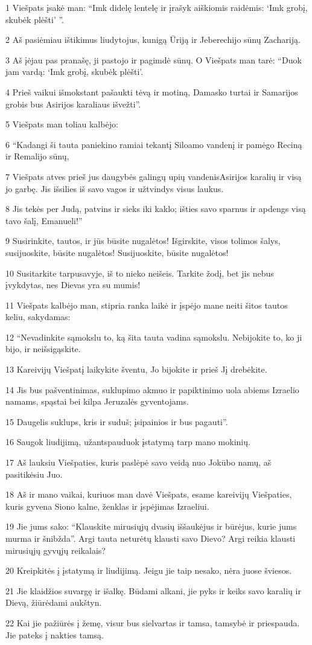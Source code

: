 \par 1 Viešpats įsakė man: “Imk didelę lentelę ir įrašyk aiškiomis raidėmis: ‘Imk grobį, skubėk plėšti’ ”. 
\par 2 Aš pasiėmiau ištikimus liudytojus, kunigą Ūriją ir Jeberechijo sūnų Zachariją. 
\par 3 Aš įėjau pas pranašę, ji pastojo ir pagimdė sūnų. O Viešpats man tarė: “Duok jam vardą: ‘Imk grobį, skubėk plėšti’. 
\par 4 Prieš vaikui išmokstant pašaukti tėvą ir motiną, Damasko turtai ir Samarijos grobis bus Asirijos karaliaus išvežti”. 
\par 5 Viešpats man toliau kalbėjo: 
\par 6 “Kadangi ši tauta paniekino ramiai tekantį Siloamo vandenį ir pamėgo Reciną ir Remalijo sūnų, 
\par 7 Viešpats atves prieš jus daugybės galingų upių vandenis­Asirijos karalių ir visą jo garbę. Jis išsilies iš savo vagos ir užtvindys visus laukus. 
\par 8 Jis tekės per Judą, patvins ir sieks iki kaklo; išties savo sparnus ir apdengs visą tavo šalį, Emanueli!” 
\par 9 Susirinkite, tautos, ir jūs būsite nugalėtos! Išgirskite, visos tolimos šalys, susijuoskite, būsite nugalėtos! Susijuoskite, būsite nugalėtos! 
\par 10 Susitarkite tarpusavyje, iš to nieko neišeis. Tarkite žodį, bet jis nebus įvykdytas, nes Dievas yra su mumis! 
\par 11 Viešpats kalbėjo man, stipria ranka laikė ir įspėjo mane neiti šitos tautos keliu, sakydamas: 
\par 12 “Nevadinkite sąmokslu to, ką šita tauta vadina sąmokslu. Nebijokite to, ko ji bijo, ir neišsigąskite. 
\par 13 Kareivijų Viešpatį laikykite šventu, Jo bijokite ir prieš Jį drebėkite. 
\par 14 Jis bus pašventinimas, suklupimo akmuo ir papiktinimo uola abiems Izraelio namams, spąstai bei kilpa Jeruzalės gyventojams. 
\par 15 Daugelis suklups, kris ir suduš; įsipainios ir bus pagauti”. 
\par 16 Saugok liudijimą, užantspauduok įstatymą tarp mano mokinių. 
\par 17 Aš lauksiu Viešpaties, kuris paslėpė savo veidą nuo Jokūbo namų, aš pasitikėsiu Juo. 
\par 18 Aš ir mano vaikai, kuriuos man davė Viešpats, esame kareivijų Viešpaties, kuris gyvena Siono kalne, ženklas ir įspėjimas Izraeliui. 
\par 19 Jie jums sako: “Klauskite mirusiųjų dvasių iššaukėjus ir būrėjus, kurie jums murma ir šnibžda”. Argi tauta neturėtų klausti savo Dievo? Argi reikia klausti mirusiųjų gyvųjų reikalais? 
\par 20 Kreipkitės į įstatymą ir liudijimą. Jeigu jie taip nesako, nėra juose šviesos. 
\par 21 Jie klaidžios suvargę ir išalkę. Būdami alkani, jie pyks ir keiks savo karalių ir Dievą, žiūrėdami aukštyn. 
\par 22 Kai jie pažiūrės į žemę, visur bus sielvartas ir tamsa, tamsybė ir priespauda. Jie pateks į nakties tamsą.



